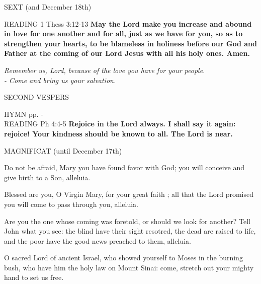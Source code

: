 \begin{flushleft}
\normalsize{\uppercase{Sext}} \small {(and December 18th)}
\end{flushleft}

\noindent\small{\uppercase{Reading}} 1 Thess 3:12-13 \textbf{May the Lord make you increase and abound in love for one another and for all, just as we have for you, so as to strengthen your hearts, to be blameless in holiness before our God and Father at the coming of our Lord Jesus with all his holy ones. Amen.}
\begin{center}
\textit{Remember us, Lord, because of the love you have for your people.\\
- Come and bring us your salvation.}
\end{center}

\begin{flushleft}
\normalsize{\uppercase{Second Vespers}}\normalsize
\end{flushleft}
\small{\uppercase{Hymn} pp. \pageref{advent:firstHymn}-\pageref{advent:lastHymn}\\}
\noindent\small{\uppercase{Reading}} Ph 4:4-5  \textbf{Rejoice in the Lord always. I shall say it again: rejoice! Your kindness should be known to all. The Lord is near.\\}

\noindent\small{\uppercase{Magnificat} (until December 17th)}
\begin{description}[labelindent=\parindent, leftmargin=*]
\item [1.] Do not be afraid, Mary you have found favor with God; you will conceive and give birth to a Son, alleluia.
\item [2.] Blessed are you, O Virgin Mary, for your great faith ; all that the Lord promised you will come to pass through you, alleluia.
\item [3.] Are you the one whose coming was foretold, or should we look for another? Tell John what you see: the blind have their sight resotred, the dead are raised to life, and the poor have the good news preached to them, alleluia.
\item [(December 18th)]
O sacred Lord of ancient Israel, who showed yourself to Moses in the burning bush, who have him the holy law on Mount Sinai: come, stretch out your mighty hand to set us free.
\end{description}
